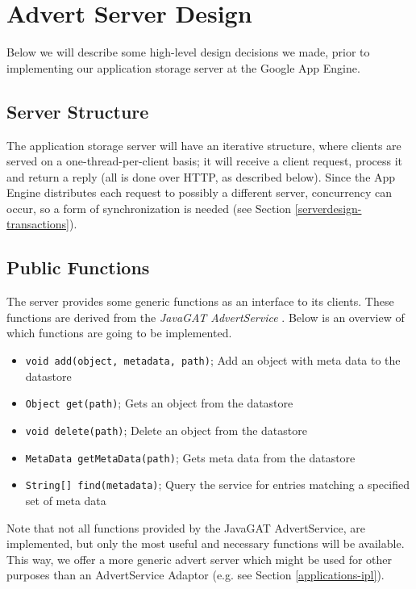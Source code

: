 \section{Advert Server Design}
\label{serverdesign}
Below we will describe some high-level design decisions we made, prior to
implementing our application storage server at the Google App Engine.

\subsection{Server Structure}
\label{serverdesign-structure}
The application storage server will have an iterative structure, where clients
are served on a one-thread-per-client basis; it will receive a client request,
process it and return a reply (all is done over HTTP, as described below). Since
the App Engine distributes each request to possibly a different server,
concurrency can occur, so a form of synchronization is needed (see Section
\ref{serverdesign-transactions}).

\subsection{Public Functions}
\label{serverdesign-pub}
The server provides some generic functions as an interface to its clients. These
functions are derived from the \emph{JavaGAT AdvertService} \cite{javagat-www}. 
Below is an overview of which functions are going to be implemented.

\begin{itemize}
	\item \texttt{void add(object, metadata, path)}; Add an object with meta data to
		the datastore
	\item \texttt{Object get(path)}; Gets an object from the datastore
	\item \texttt{void delete(path)}; Delete an object from the datastore
	\item \texttt{MetaData getMetaData(path)}; Gets meta data from the datastore
	\item \texttt{String[] find(metadata)}; Query the service for entries matching
		a specified set of meta data 
\end{itemize}

Note that not all functions provided by the JavaGAT AdvertService, are
implemented, but only the most useful and necessary functions will be
available. This way, we offer a more generic advert server which might be
used for other purposes than an AdvertService Adaptor (e.g. see Section
\ref{applications-ipl}).

